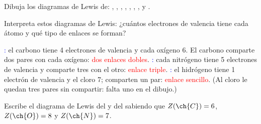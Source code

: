 \begin{exercise}
    Dibuja los diagramas de Lewis de: , , , , , , ,  y .
    \begin{solu}
        \begin{center}
             \qquad
             \qquad
             \qquad
             \qquad

            \medskip
             \qquad
             \qquad
             \qquad
        \end{center}
    \end{solu}
\end{exercise}

\begin{exercise}
    Interpreta estos diagramas de Lewis: ¿cuántos electrones de valencia tiene cada átomo y qué tipo de enlaces se forman?
    \begin{center}
         \qquad
         \qquad
    \end{center}
    \begin{solu}
        \textcolor{blue}{:} el carbono tiene 4 electrones de valencia y cada oxígeno 6. El carbono comparte dos pares con cada oxígeno: \textcolor{red}{dos enlaces dobles}.
        \textcolor{blue}{:} cada nitrógeno tiene 5 electrones de valencia y comparte tres con el otro: \textcolor{red}{enlace triple}.
        \textcolor{blue}{:} el hidrógeno tiene 1 electrón de valencia y el cloro 7; comparten un par: \textcolor{red}{enlace sencillo}. (Al cloro le quedan tres pares sin compartir: falta uno en el dibujo.)
    \end{solu}
\end{exercise}

\begin{exercise}
    Escribe el diagrama de Lewis del  y del  sabiendo que \(Z(\ch{C}) = 6\), \(Z(\ch{O}) = 8\) y \(Z(\ch{N}) = 7\).
    \begin{solu}
         \qquad {}
    \end{solu}
\end{exercise}

